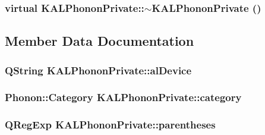 \hypertarget{class_k_a_l_phonon_private_775f32e1dd46bf599abcb912977f8598}{
\subsubsection[{$\sim$KALPhononPrivate}]{\setlength{\rightskip}{0pt plus 5cm}virtual KALPhononPrivate::$\sim$KALPhononPrivate ()}}
\label{class_k_a_l_phonon_private_775f32e1dd46bf599abcb912977f8598}




\subsection{Member Data Documentation}
\hypertarget{class_k_a_l_phonon_private_3b0ba12a82466c11a8ae856a556ecd1b}{
\subsubsection[{alDevice}]{\setlength{\rightskip}{0pt plus 5cm}QString {\bf KALPhononPrivate::alDevice}}}
\label{class_k_a_l_phonon_private_3b0ba12a82466c11a8ae856a556ecd1b}


\hypertarget{class_k_a_l_phonon_private_a70c7137cc8b53ad13d280cf7a704102}{
\subsubsection[{category}]{\setlength{\rightskip}{0pt plus 5cm}Phonon::Category {\bf KALPhononPrivate::category}}}
\label{class_k_a_l_phonon_private_a70c7137cc8b53ad13d280cf7a704102}


\hypertarget{class_k_a_l_phonon_private_785b4d74d79509777a8ec902e794442f}{
\subsubsection[{parentheses}]{\setlength{\rightskip}{0pt plus 5cm}QRegExp {\bf KALPhononPrivate::parentheses}}}
\label{class_k_a_l_phonon_private_785b4d74d79509777a8ec902e794442f}


